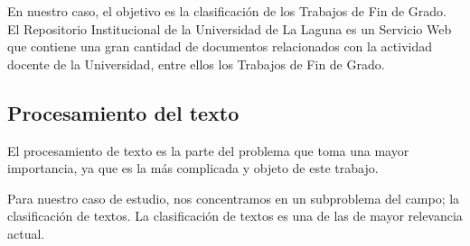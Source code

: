 En nuestro caso, el objetivo es la clasificación de los Trabajos de Fin de Grado. El Repositorio Institucional de la Universidad de La Laguna es un Servicio Web que contiene una gran cantidad de documentos relacionados con la actividad docente de la Universidad, entre ellos los Trabajos de Fin de Grado.

\subsection{Procesamiento del texto}

El procesamiento de texto es la parte del problema que toma una mayor importancia, ya que es la más complicada y objeto de este trabajo.

Para nuestro caso de estudio, nos concentramos en un subproblema del campo; la clasificación de textos. La clasificación de textos es una de las de mayor relevancia actual.
